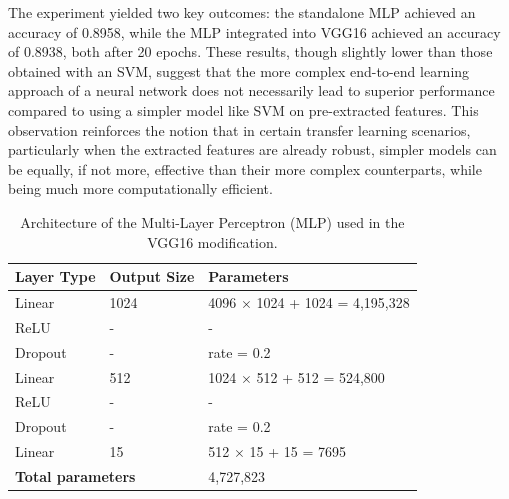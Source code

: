 The experiment yielded two key outcomes: the standalone MLP achieved an accuracy of 0.8958, while the MLP integrated into VGG16 achieved an accuracy of 0.8938, both after 20 epochs. These results, though slightly lower than those obtained with an SVM, suggest that the more complex end-to-end learning approach of a neural network does not necessarily lead to superior performance compared to using a simpler model like SVM on pre-extracted features. This observation reinforces the notion that in certain transfer learning scenarios, particularly when the extracted features are already robust, simpler models can be equally, if not more, effective than their more complex counterparts, while being much more computationally efficient.

\begin{table}[H]
    \centering
    \begin{tabular}{@{}lll@{}}
        \toprule
        \textbf{Layer Type}                           & \textbf{Output Size} & \textbf{Parameters}                   \\ \midrule
        Linear                                        & 1024                 & 4096 $\times$ 1024 + 1024 = 4,195,328 \\
        ReLU                                          & -                    & -                                     \\
        Dropout                                       & -                    & rate = 0.2                            \\
        Linear                                        & 512                  & 1024 $\times$ 512 + 512 = 524,800     \\
        ReLU                                          & -                    & -                                     \\
        Dropout                                       & -                    & rate = 0.2                            \\
        Linear                                        & 15                   & 512 $\times$ 15 + 15 = 7695           \\
        \midrule
        \multicolumn{2}{l}{\textbf{Total parameters}} & 4,727,823                                                    \\
        \bottomrule
    \end{tabular}
    \caption{Architecture of the Multi-Layer Perceptron (MLP) used in the VGG16 modification.}
    \label{tab:mlp_architecture}
\end{table}

